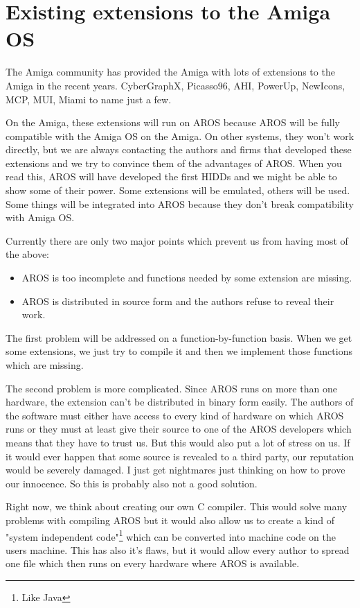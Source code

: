 \section{Existing extensions to the Amiga OS}

The Amiga community has provided the Amiga with lots of extensions to the
Amiga in the recent years. CyberGraphX, Picasso96, AHI, PowerUp, NewIcons,
MCP, MUI, Miami to name just a few.

On the Amiga, these extensions will run on AROS because AROS will be fully
compatible with the Amiga OS on the Amiga. On other systems, they won't work
directly, but we are always contacting the authors and firms that developed
these extensions and we try to convince them of the advantages of AROS. When
you read this, AROS will have developed the first HIDDs and we might be
able to show some of their power. Some extensions will be emulated, others
will be used. Some things will be integrated into AROS because they don't
break compatibility with Amiga OS.

Currently there are only two major points which prevent us from having most
of the above:

\begin{itemize}
\item AROS is too incomplete and functions needed by some extension are
missing.

\item AROS is distributed in source form and the authors refuse to reveal
their work.

\end{itemize}

The first problem will be addressed on a function-by-function basis. When we
get some extensions, we just try to compile it and then we implement those
functions which are missing.

The second problem is more complicated. Since AROS runs on more than one
hardware, the extension can't be distributed in binary form easily. The
authors of the software must either have access to every kind of hardware
on which AROS runs or they must at least give their source to one of the
AROS developers which means that they have to trust us. But this would also
put a lot of stress on us. If it would ever happen that some source is
revealed to a third party, our reputation would be severely damaged. I just
get nightmares just thinking on how to prove our innocence. So this is
probably also not a good solution.

Right now, we think about creating our own C compiler. This would solve
many problems with compiling AROS but it would also allow us to create a
kind of "system independent code"\footnote{Like Java} which can be
converted into machine code on the users machine. This has also it's flaws,
but it would allow every author to spread one file which then runs on every
hardware where AROS is available.

